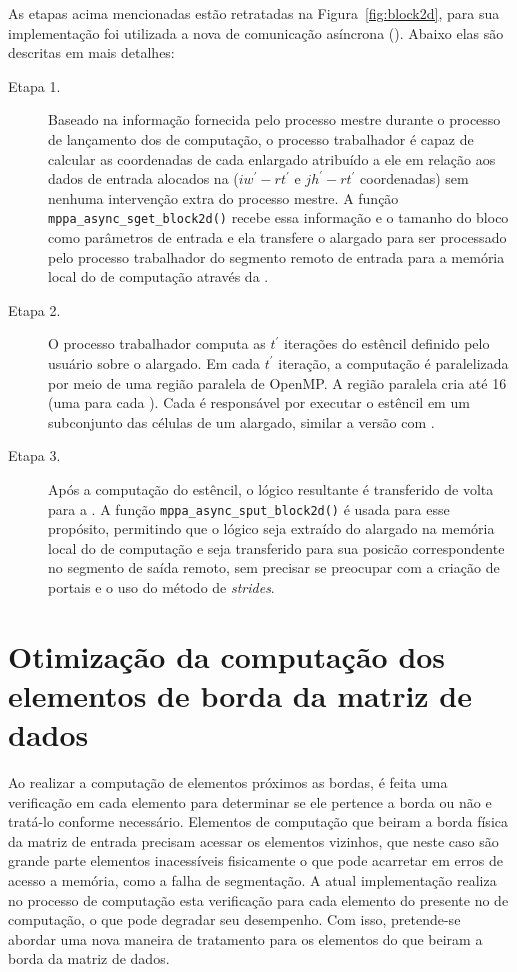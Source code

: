 As etapas acima mencionadas estão retratadas na Figura~\ref{fig:block2d}, para sua implementação foi utilizada a nova \api de comunicação asíncrona (\async). Abaixo elas são descritas em mais detalhes:

\begin{description}

	\item[Etapa 1.] Baseado na informação fornecida pelo processo mestre durante o processo de lançamento dos \clusters de computação, o processo trabalhador é capaz de calcular as coordenadas de cada \tile enlargado atribuído a ele em relação aos dados de entrada alocados na \lpddr ($iw^\prime - rt^\prime$ e $jh^\prime - rt^\prime$ coordenadas) sem nenhuma intervenção extra do processo mestre. A função \texttt{mppa\_async\_sget\_block2d()} recebe essa informação e o tamanho do bloco como parâmetros de entrada e ela transfere o \tile alargado para ser processado pelo processo trabalhador do segmento remoto de entrada para a memória local do \cluster de computação através da \noc.

	\item[Etapa 2.] O processo trabalhador computa as $t^\prime$ iterações do  estêncil definido pelo usuário sobre o \tile alargado. Em cada $t^\prime$ iteração, a computação é paralelizada por meio de uma região paralela de OpenMP. A região paralela cria até 16 \threads (uma para cada \pe). Cada \pe é responsável por executar o  estêncil em um subconjunto das células de um \tile alargado, similar a versão com \ipc.

	\item[Etapa 3.] Após a computação do  estêncil, o \tile lógico resultante é transferido de volta para a \lpddr. A função \texttt{mppa\_async\_sput\_block2d()} é usada para esse propósito, permitindo que o \tile lógico seja extraído do \tile alargado na memória local do \cluster de computação e seja transferido para sua posicão correspondente no segmento de saída remoto, sem precisar se preocupar com a criação de portais e o uso do método de \textit{strides}.

\end{description}

\section{Otimização da computação dos elementos de borda da matriz de dados}
\label{sec:otimizacao-bordas}

Ao realizar a computação de elementos próximos as bordas, é feita uma verificação em cada elemento para determinar se ele pertence a borda ou não e tratá-lo conforme necessário. Elementos de computação que beiram a borda física da matriz de entrada precisam acessar os elementos vizinhos, que neste caso são grande parte elementos inacessíveis fisicamente o que pode acarretar em erros de acesso a memória, como a falha de segmentação. A atual implementação realiza no processo de computação esta verificação para cada elemento do \tile presente no \cluster de computação, o que pode degradar seu desempenho. Com isso, pretende-se abordar uma nova maneira de tratamento para os elementos do \tile que beiram a borda da matriz de dados. 

